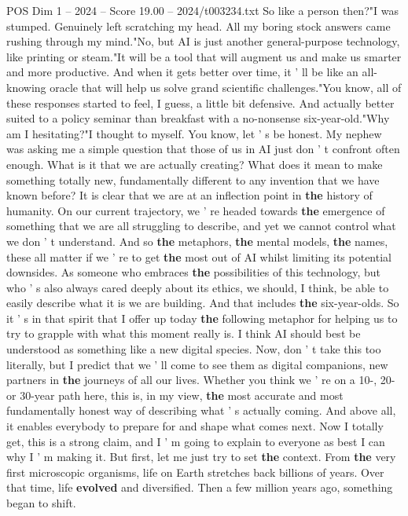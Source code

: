 \begin{textsample}{POS Dim 1 – 2024 – Score 19.00 – 2024/t003234.txt}
So like a person then?"I was stumped.
Genuinely left scratching my head.
All my boring stock answers came rushing through my mind."No, but AI is just another general-purpose technology, like printing or steam."It will be a tool that will augment us and make us smarter and more productive.
And when it gets better over time, it ' ll be like an all-knowing oracle that will help us solve grand scientific challenges."You know, all of these responses started to feel, I guess, a little bit defensive.
And actually better suited to a policy seminar than breakfast with a no-nonsense six-year-old."Why am I hesitating?"I thought to myself.
You know, let ' s be honest.
My nephew was asking me a simple question that those of us in AI just don ' t confront often enough.
What is it that we are actually creating?
What does it mean to make something totally new, fundamentally different to any invention that we have known before?
It is clear that we are at an inflection point in \textbf{the} history of humanity.
On our current trajectory, we ' re headed towards \textbf{the} emergence of something that we are all struggling to describe, and yet we cannot control what we don ' t understand.
And so \textbf{the} metaphors, \textbf{the} mental models, \textbf{the} names, these all matter if we ' re to get \textbf{the} most out of AI whilst limiting its potential downsides.
As someone who embraces \textbf{the} possibilities of this technology, but who ' s also always cared deeply about its ethics, we should, I think, be able to easily describe what it is we are building.
And that includes \textbf{the} six-year-olds.
So it ' s in that spirit that I offer up today \textbf{the} following metaphor for helping us to try to grapple with what this moment really is.
I think AI should best be understood as something like a new digital species.
Now, don ' t take this too literally, but I predict that we ' ll come to see them as digital companions, new partners in \textbf{the} journeys of all our lives.
Whether you think we ' re on a 10-, 20- or 30-year path here, this is, in my view, \textbf{the} most accurate and most fundamentally honest way of describing what ' s actually coming.
And above all, it enables everybody to prepare for and shape what comes next.
Now I totally get, this is a strong claim, and I ' m going to explain to everyone as best I can why I ' m making it.
But first, let me just try to set \textbf{the} context.
From \textbf{the} very first microscopic organisms, life on Earth stretches back billions of years.
Over that time, life \textbf{evolved} and diversified.
Then a few million years ago, something began to shift.

\end{textsample}
